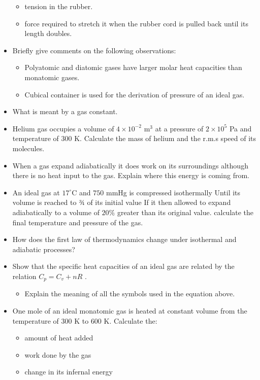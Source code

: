 \documentclass{article}
\begin{document}
\begin{itemize}
 \begin{itemize}
\item tension in the rubber. 
\item force required to stretch it when the rubber cord is pulled back until its length doubles. 
\end{itemize}
\item Briefly give comments on the following observations:
 \begin{itemize}
\item Polyatomic and diatomic gases have larger molar heat capacities than monatomic gases. 
\item  Cubical container is used for the derivation of pressure of an ideal gas.
\end{itemize}
\item What is meant by a gas constant. 
\item Helium gas occupies a volume of $ 4 \times 10^{-2}$ m$ ^{3}$ at a pressure of $ 2 \times 10^{5}$ Pa and temperature of $ 300$ K. Calculate the mass of helium and the r.m.s speed of its molecules.
\item When a gas expand adiabatically it does work on its surroundings although there is no heat input to the gas. Explain where this energy is coming from.
\item An ideal gas at $ 17^{\circ}$C and $ 750$ mmHg is compressed isothermally Until its volume is reached to ¾ of its initial value If it then allowed to expand adiabatically to a volume of $ 20\%$ greater than its original value. calculate the final temperature and pressure of the gas. 
\item How does the first law of thermodynamics change under isothermal and adiabatic processes? 
\item Show that the specific heat capacities of an ideal gas are related by the relation $ C_{p}=C_{v}+nR$ .
 \begin{itemize}
\item Explain the meaning of all the symbols used in the equation above.
\end{itemize}
\item One mole of an ideal monatomic gas is heated at constant volume from the temperature of $ 300$ K to $ 600$ K. Calculate the:
 \begin{itemize}
\item amount of heat added 
\item work done by the gas 
\item change in its infernal energy
\end{itemize}

\end{itemize}
\end{document}
